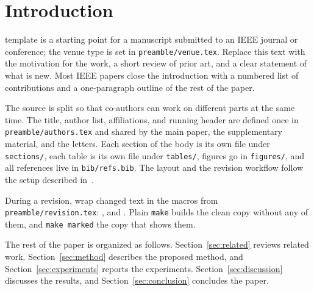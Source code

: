 \section{Introduction}
\label{sec:introduction}

 template is a starting point for a manuscript submitted to an IEEE journal or conference; the venue type is set in \texttt{preamble/venue.tex}. Replace this text with the motivation for the work, a short review of prior art, and a clear statement of what is new. Most IEEE papers close the introduction with a numbered list of contributions and a one-paragraph outline of the rest of the paper.

The source is split so that co-authors can work on different parts at the same time. The title, author list, affiliations, and running header are defined once in \texttt{preamble/authors.tex} and shared by the main paper, the supplementary material, and the letters. Each section of the body is its own file under \texttt{sections/}, each table is its own file under \texttt{tables/}, figures go in \texttt{figures/}, and all references live in \texttt{bib/refs.bib}. The layout and the revision workflow follow the setup described in~\cite{wang2026oneprompt}.

During a revision, wrap changed text in the macros from \texttt{preamble/revision.tex}: , and . Plain \texttt{make} builds the clean copy without any of them, and \texttt{make marked} the copy that shows them.

The rest of the paper is organized as follows. Section~\ref{sec:related} reviews related work. Section~\ref{sec:method} describes the proposed method, and Section~\ref{sec:experiments} reports the experiments. Section~\ref{sec:discussion} discusses the results, and Section~\ref{sec:conclusion} concludes the paper.
